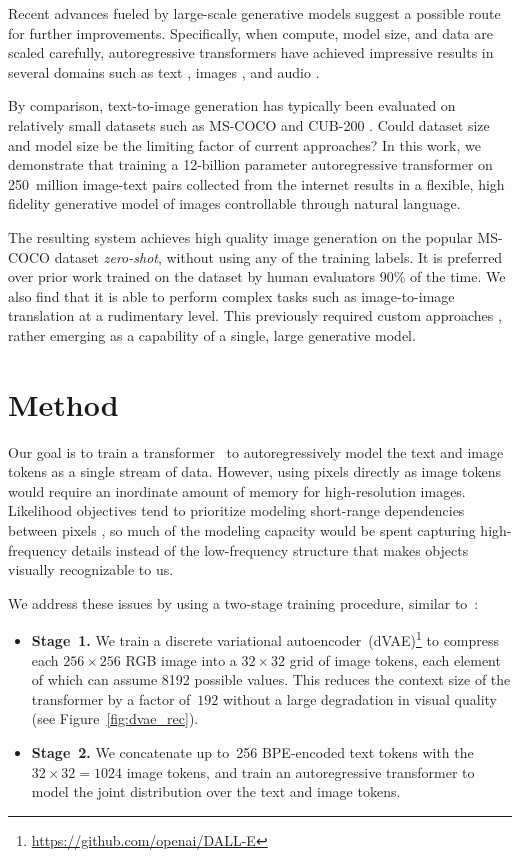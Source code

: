 Recent advances fueled by large-scale generative models suggest a possible route for further improvements. Specifically, when compute, model size, and data are scaled carefully, autoregressive transformers \citep{vaswani2017attention} have achieved impressive results in several domains such as text \citep{radford2019language}, images \citep{chen2020generative}, and audio \citep{dhariwal2020jukebox}.

By comparison, text-to-image generation has typically been evaluated on relatively small datasets such as MS-COCO and CUB-200 \citep{welinder2010caltech}. Could dataset size and model size be the limiting factor of current approaches? In this work, we demonstrate that training a 12-billion parameter autoregressive transformer on 250~million image-text pairs collected from the internet results in a flexible, high fidelity generative model of images controllable through natural language.

The resulting system achieves high quality image generation on the popular MS-COCO dataset \textit{zero-shot}, without using any of the training labels. It is preferred over prior work trained on the dataset by human evaluators 90\% of the time. We also find that it is able to perform complex tasks such as image-to-image translation at a rudimentary level. This previously required custom approaches \citep{isola2017image}, rather emerging as a capability of a single, large generative model.

\section{Method}

Our goal is to train a transformer~\cite{vaswani2017attention} to autoregressively model the text and image tokens as a single stream of data. However, using pixels directly as image tokens would require an inordinate amount of memory for high-resolution images. Likelihood objectives tend to prioritize modeling short-range dependencies between pixels \citep{salimans2017pixelcnn++}, so much of the modeling capacity would be spent capturing high-frequency details instead of the low-frequency structure that makes objects visually recognizable to us.

We address these issues by using a two-stage training procedure, similar to~\cite{oord2017neural,razavi2019generating}:

\begin{itemize}
    \item \textbf{Stage~1.} We train a discrete variational autoencoder~(dVAE)\footnote{\url{https://github.com/openai/DALL-E}} to compress each $256 \times 256$ RGB image into a $32 \times 32$ grid of image tokens, each element of which can assume \num{8192} possible values. This reduces the context size of the transformer by a factor of~$192$ without a large degradation in visual quality (see Figure~\ref{fig:dvae_rec}).
    \item \textbf{Stage~2.} We concatenate up to~256 BPE-encoded text tokens with the~$32 \times 32 = 1024$ image tokens, and train an autoregressive transformer to model the joint distribution over the text and image tokens.
\end{itemize}

